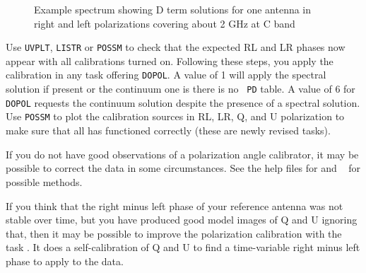 \begin{figure}
\centering
\caption[Example antenna D term spectrum]{Example spectrum showing D
term solutions for one antenna in right and left polarizations
covering about 2 GHz at C band}
\label{fig:PCALspec}
\end{figure}

Use {\tt UVPLT}, {\tt LISTR} or {\tt POSSM} to check that the expected
RL and LR phases now appear with all calibrations turned on.
Following these steps, you apply the  calibration
in any task offering {\tt DOPOL}.  A value of 1 will apply the
spectral solution if present or the continuum one is there is no {\tt
PD} table.  A value of 6 for {\tt DOPOL} requests the continuum
solution despite the presence of a spectral solution.  Use {\tt POSSM}
to plot the calibration sources in RL, LR, Q, and U polarization to
make sure that all has functioned correctly (these are newly revised
tasks).

If you do not have good observations of a polarization angle
calibrator, it may be possible to correct the data in some
circumstances.  See the help files for {\tt {}} and {\tt
{}} for possible methods.

If you think that the right minus left phase of your reference antenna
was not stable over time, but you have produced good model images of Q
and U ignoring that, then it may be possible to improve the
polarization calibration with the task {\tt {}}\@.  It does
a self-calibration of Q and U to find a time-variable right minus left
phase to apply to the data.


